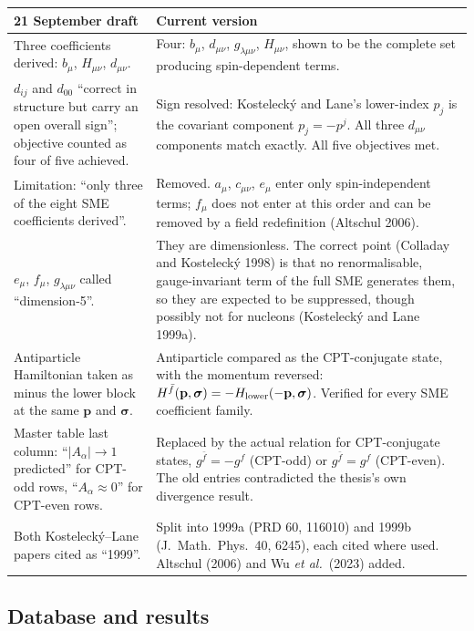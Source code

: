 \documentclass[11pt,a4paper]{article}
\newcommand{\sig}{\bm{\sigma}}
\newcommand{\Aa}{A_\alpha}
\newcommand{\gfb}{g^{\bar f}}
\begin{document}
\begin{longtable}{@{}p{}p{}@{}}
\toprule
\textbf{21 September draft} & \textbf{Current version} \\
\midrule
\endhead
Three coefficients derived: $b_\mu$, $H_{\mu\nu}$, $d_{\mu\nu}$.
& Four: $b_\mu$, $d_{\mu\nu}$, $g_{\lambda\mu\nu}$, $H_{\mu\nu}$, shown to be
the complete set producing spin-dependent terms. \\[0.4em]
$d_{ij}$ and $d_{00}$ ``correct in structure but carry an open overall
sign''; objective counted as four of five achieved.
& Sign resolved: Kostelecký and Lane's lower-index $p_j$ is the covariant
component $p_j=-p^j$. All three $d_{\mu\nu}$ components match exactly.
All five objectives met. \\[0.4em]
Limitation: ``only three of the eight SME coefficients derived''.
& Removed. $a_\mu$, $c_{\mu\nu}$, $e_\mu$ enter only spin-independent
terms; $f_\mu$ does not enter at this order and can be removed by a field
redefinition (Altschul 2006). \\[0.4em]
$e_\mu$, $f_\mu$, $g_{\lambda\mu\nu}$ called ``dimension-5''.
& They are dimensionless. The correct point (Colladay and Kostelecký
1998) is that no renormalisable, gauge-invariant term of the full SME
generates them, so they are expected to be suppressed, though possibly
not for nucleons (Kostelecký and Lane 1999a). \\[0.4em]
Antiparticle Hamiltonian taken as minus the lower block at the same
$\mathbf p$ and $\sig$.
& Antiparticle compared as the CPT-conjugate state, with the momentum
reversed: $H^{\bar f}(\mathbf p,\sig)=-H_{\rm lower}(-\mathbf p,\sig)$.
Verified for every SME coefficient family. \\[0.4em]
Master table last column: ``$|\Aa|\to1$ predicted'' for CPT-odd rows,
``$\Aa\approx0$'' for CPT-even rows.
& Replaced by the actual relation for CPT-conjugate states,
$\gfb=-g^f$ (CPT-odd) or $\gfb=g^f$ (CPT-even). The old entries
contradicted the thesis's own divergence result. \\[0.4em]
Both Kostelecký--Lane papers cited as ``1999''.
& Split into 1999a (PRD 60, 116010) and 1999b (J.\ Math.\ Phys.\ 40,
6245), each cited where used. Altschul (2006) and Wu \textit{et al.}\
(2023) added. \\
\bottomrule
\end{longtable}

\subsection{Database and results}
\end{document}
